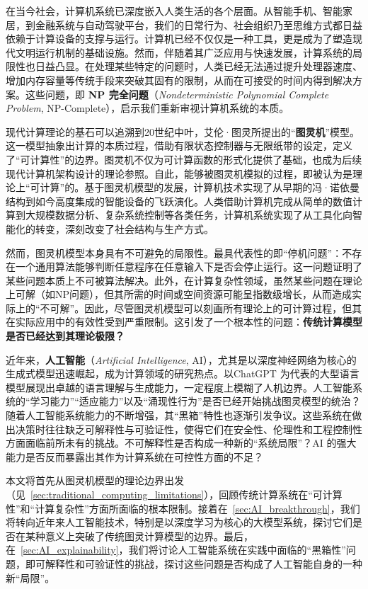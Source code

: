 \documentclass[UTF8,openany,zihao=5]{ctexbook}
\begin{document}
在当今社会，计算机系统已深度嵌入人类生活的各个层面。从智能手机、智能家居，到金融系统与自动驾驶平台，我们的日常行为、社会组织乃至思维方式都日益依赖于计算设备的支撑与运行。计算机已经不仅仅是一种工具，更是成为了塑造现代文明运行机制的基础设施。然而，伴随着其广泛应用与快速发展，计算系统的局限性也日益凸显。在处理某些特定的问题时，人类已经无法通过提升处理器速度、增加内存容量等传统手段来突破其固有的限制，从而在可接受的时间内得到解决方案。这些问题，即 \textbf{NP 完全问题}（\textit{Nondeterministic Polynomial Complete Problem}\cite{Cook1971}, NP-Complete），启示我们重新审视计算机系统的本质。

现代计算理论的基石可以追溯到20世纪中叶，艾伦·图灵所提出的“\textbf{图灵机}”模型\cite{turing1936computable}。这一模型抽象出计算的本质过程，借助有限状态控制器与无限纸带的设定，定义了“可计算性”的边界。图灵机不仅为可计算函数的形式化提供了基础，也成为后续现代计算机架构设计的理论参照。自此，能够被图灵机模拟的过程，即被认为是理论上“可计算”的。基于图灵机模型的发展，计算机技术实现了从早期的冯·诺依曼结构到如今高度集成的智能设备的飞跃演化。人类借助计算机完成从简单的数值计算到大规模数据分析、复杂系统控制等各类任务，计算机系统实现了从工具化向智能化的转变，深刻改变了社会结构与生产方式。

然而，图灵机模型本身具有不可避免的局限性。最具代表性的即“停机问题”：不存在一个通用算法能够判断任意程序在任意输入下是否会停止运行。这一问题证明了某些问题本质上不可被算法解决。此外，在计算复杂性领域，虽然某些问题在理论上可解（如NP问题），但其所需的时间或空间资源可能呈指数级增长，从而造成实际上的“不可解”。因此，尽管图灵机模型可以刻画所有理论上的可计算过程，但其在实际应用中的有效性受到严重限制。这引发了一个根本性的问题：\textbf{传统计算模型是否已经达到其理论极限？}

近年来，\textbf{人工智能}（\textit{Artificial Intelligence}, AI），尤其是以深度神经网络为核心的生成式模型迅速崛起，成为计算领域的研究热点。以ChatGPT\cite{radford2018improving} 为代表的大型语言模型展现出卓越的语言理解与生成能力，一定程度上模糊了人机边界。人工智能系统的“学习能力”“适应能力”以及“涌现性行为”是否已经开始挑战图灵模型的统治？随着人工智能系统能力的不断增强，其“黑箱”特性也逐渐引发争议。这些系统在做出决策时往往缺乏可解释性与可验证性，使得它们在安全性、伦理性和工程控制性方面面临前所未有的挑战。不可解释性是否构成一种新的“系统局限”？AI 的强大能力是否反而暴露出其作为计算系统在可控性方面的不足？

本文将首先从图灵机模型的理论边界出发（见\textsection~\ref{sec:traditional_computing_limitations}），回顾传统计算系统在“可计算性”和“计算复杂性”方面所面临的根本限制。接着在\textsection~\ref{sec:AI_breakthrough}，我们将转向近年来人工智能技术，特别是以深度学习为核心的大模型系统，探讨它们是否在某种意义上突破了传统图灵计算模型的边界。最后，在\textsection~\ref{sec:AI_explainability}，我们将讨论人工智能系统在实践中面临的“黑箱性”问题，即可解释性和可验证性的挑战，探讨这些问题是否构成了人工智能自身的一种新“局限”。
\end{document}
